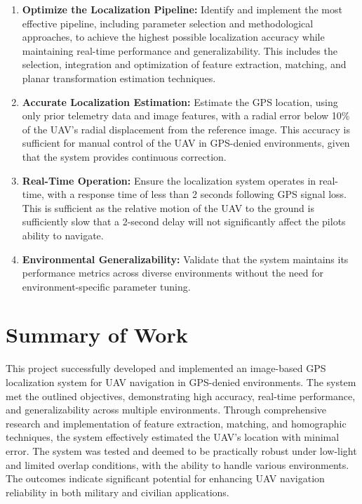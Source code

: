 \begin{enumerate}
    \item \textbf{Optimize the Localization Pipeline:} Identify and implement the most effective pipeline, including parameter selection and methodological approaches, to achieve the highest possible localization accuracy while maintaining real-time performance and generalizability. This includes the selection, integration and optimization of feature extraction, matching, and planar transformation estimation techniques.
    \item \textbf{Accurate Localization Estimation:} Estimate the GPS location, using only prior telemetry data and image features, with a radial error below 10\% of the UAV's radial displacement from the reference image. This accuracy is sufficient for manual control of the UAV in GPS-denied environments, given that the system provides continuous correction.
    \item \textbf{Real-Time Operation:} Ensure the localization system operates in real-time, with a response time of less than 2 seconds following GPS signal loss. This is sufficient as the relative motion of the UAV to the ground is sufficiently slow that a 2-second delay will not significantly affect the pilots ability to navigate.
    \item \textbf{Environmental Generalizability:} Validate that the system maintains its performance metrics across diverse environments without the need for environment-specific parameter tuning.
\end{enumerate}

\section{Summary of Work}
This project successfully developed and implemented an image-based GPS localization system for UAV navigation in GPS-denied environments. The system met the outlined objectives, demonstrating high accuracy, real-time performance, and generalizability across multiple environments. Through comprehensive research and implementation of feature extraction, matching, and homographic techniques, the system effectively estimated the UAV's location with minimal error. The system was tested and deemed to be practically robust under low-light and limited overlap conditions, with the ability to handle various environments. The outcomes indicate significant potential for enhancing UAV navigation reliability in both military and civilian applications.

